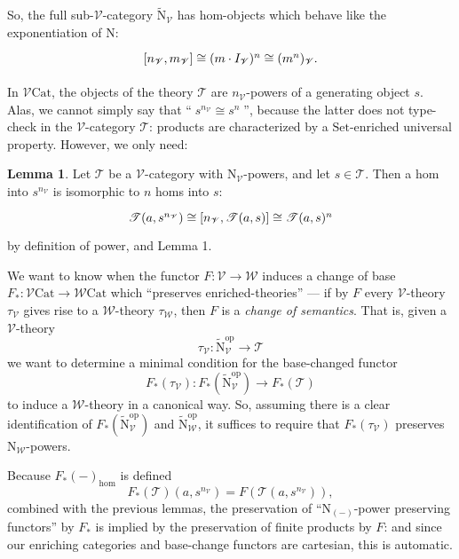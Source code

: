 \documentclass{amsart}
\theoremstyle{definition}
\newtheorem{lemma}[theorem]{Lemma}
\newcommand{\Set}{\mathrm{Set}}
\newcommand{\Cat}{\mathrm{Cat}}
\newcommand{\op}{\mathrm{op}}
\newcommand{\NN}{\mathrm{N}}
\newcommand{\V}{\mathscr{V}}
\newcommand{\W}{\mathscr{W}}
\newcommand{\T}{\mathscr{T}}
\newcommand{\maps}{\colon}
\begin{document}
So, the full sub-$\V$-category $\tilde{\NN}_\V$ has hom-objects which behave like the exponentiation of $\NN$:
\[\begin{tikzcd}
\left[n_\V,m_\V\right] \cong (m\cdot I_\V)^n \cong (m^n)_\V.
\end{tikzcd}\]

In $\V\Cat$, the objects of the theory $\T$ are $n_\V$-powers of a generating object $s$. Alas, we cannot simply say that ``$\;s^{n_\V} \cong s^n\;$'', because the latter does not type-check in the $\V$-category $\T$: products are characterized by a $\Set$-enriched universal property. However, we only need:

\begin{lemma}
	Let $\T$ be a $\V$-category with $\NN_\V$-powers, and let $s \in \T$. Then a hom into $s^{n_\V}$ is isomorphic to $n$ homs into $s$: \[\begin{tikzcd} \T(a,s^{n_\V}) \cong [n_\V,\T(a,s)] \cong \T(a,s)^n \end{tikzcd}\] by definition of power, and Lemma 1.
\end{lemma}

We want to know when the functor $F\maps\V \to \W$ induces a change of base $F_*\maps\V\Cat \to \W\Cat$ which ``preserves enriched-theories'' --- if by $F$ every $\V$-theory $\tau_\V$ gives rise to a $\W$-theory $\tau_\W$, then $F$ is a \textit{change of semantics}. That is, given a $\V$-theory $$\tau_\V\maps \tilde{\NN}_\V^\op \to \T$$ we want to determine a minimal condition for the base-changed functor $$F_*(\tau_\V)\maps F_*(\tilde{\NN}_\V^\op) \to F_*(\T)$$ to induce a $\W$-theory in a canonical way. So, assuming there is a clear identification of $F_*(\tilde{\NN}_\V^\op)$ and $\tilde{\NN}_\W^\op$, it suffices to require that $F_*(\tau_\V)$ preserves $\NN_\W$-powers.

Because $F_*(-)_{\text{hom}}$ is defined $$F_*(\T)(a,s^{n_\V}) = F(\T(a,s^{n_\V})),$$ combined with the previous lemmas, the preservation of ``$\NN_{(-)}$-power preserving functors'' by $F_*$ is implied by the preservation of finite products by $F$: and since our enriching categories and base-change functors are cartesian, this is automatic.
\end{document}
